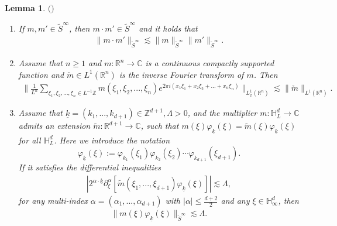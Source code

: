 \documentclass[UTF-8,reqno]{amsart}
\numberwithin{equation}{section}
\newtheorem{lemma}[theorem]{Lemma}
\theoremstyle{definition}
\def\geq{\geqslant}
\def\leq{\leqslant}
\def\geq{\geqslant}
\def\leq{\leqslant}
\begin{document}
 \begin{lemma}$($\cite[Lemma 2.2]{DIP25a}$)$\label{lem:sinfty}
 \begin{enumerate}
     \item %
    If $m,m'\in \tilde{S}^\infty$, then $m\cdot m'\in \tilde{S}^\infty$ and it holds that 
     \begin{align*}
         \|m\cdot m'\|_{\tilde{S}^\infty}\lesssim   \|m \|_{\tilde{S}^\infty}  \|  m'\|_{\tilde{S}^\infty}.
     \end{align*}
   \item 
Assume that $n\geq1$ and $m:\mathbb{R}^n\to\mathbb{C}$ is a continuous compactly supported function and $\check{m}\in L^1(\mathbb{R}^n)$ is the  inverse Fourier transform of $m$. Then
\begin{align}
    \bigg \|\frac{1}{L^{n}}\sum_{\xi_1,\xi_2,...,\xi_n\in L^{-1} \mathbb{Z}}m(\xi_1,\xi_2,...,\xi_n)e^{2\pi i(x_1\xi_1+x_2\xi_2+...+x_n\xi_n)} \bigg \|_{L^1_x(\mathbb{R}^n)}\lesssim\|\check{m}\|_{L^1(\mathbb{R}^n)}.
\end{align}
\item  Assume that $\underline{k}=(k_1,...,k_{d+1})\in\mathbb{Z}^{d+1},\Lambda>0$,  and the multiplier $m:\mathbb{H}_L^d\to\mathbb{C}$  admits an extension $\tilde{m}:\mathbb{R}^{d+1}\to\mathbb{C}$, such that  $m(\xi)\varphi_{\underline{k}}(\xi)=\tilde{m}(\xi)\varphi_{\underline{k}}(\xi)$ for all $\mathbb{H}_L^d$. Here we introduce the notation $$\varphi_{\underline{k}}(\xi):=\varphi_{k_1}(\xi_1)\varphi_{k_2}(\xi_2)\cdots\varphi_{k_{d+1}}(\xi_{d+1}).$$  If it  satisfies the differential inequalities
\begin{align*}
    |2^{\alpha\cdot \underline{k}}\partial_{\xi}^\alpha[\tilde{m}(\xi_1,...,\xi_{d+1})\varphi_{\underline{k}}(\xi)]|\lesssim \Lambda,
\end{align*}
for any multi-index $\alpha=(\alpha_1,...,\alpha_{d+1})$ with $|\alpha|\leq \frac{d+2}{2}$ and any $\xi\in\mathbb{H}_{\infty}^d$, then
\begin{align*}
    \|m(\xi)\varphi_{\underline{k}}(\xi)\|_{\tilde{S}^\infty}\lesssim \Lambda.
\end{align*}
 \end{enumerate}

 \end{lemma}
\end{document}
